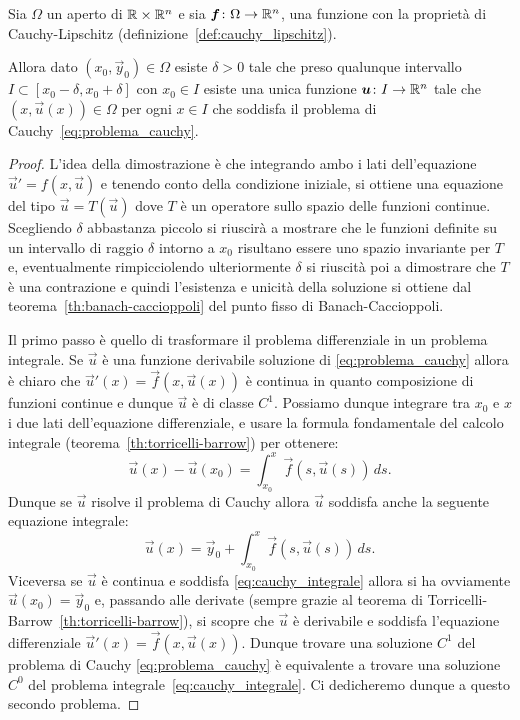 \begin{theorem}
\label{th:cauchy_lipschitz}%
%
\mymark{***}%
Sia $\Omega$ un aperto di $\mathbb R\times \mathbb R^n$ e sia $\boldsymbol f\colon \Omega \to \mathbb R^n$,
una funzione con la proprietà di Cauchy-Lipschitz
(definizione~\ref{def:cauchy_lipschitz}).

Allora dato $(x_0,\vec y_0)\in \Omega$
esiste $\delta>0$
tale che preso qualunque intervallo $I\subset [x_0-\delta,x_0+\delta]$
con $x_0\in I$
esiste una unica funzione $\boldsymbol u\colon I \to \mathbb R^n$
tale che $(x,\vec u(x))\in \Omega$ per ogni $x\in I$
che soddisfa il problema di Cauchy~\eqref{eq:problema_cauchy}.
\end{theorem}
%
%
\begin{proof}
\mymark{***}
L'idea della dimostrazione è che integrando ambo i lati dell'equazione
$\vec u' = f(x,\vec u)$ e tenendo conto della condizione iniziale, si
ottiene una equazione del tipo $\vec u = T(\vec u)$ dove $T$ è un operatore
sullo spazio delle funzioni continue.
Scegliendo $\delta$ abbastanza piccolo si riuscirà a mostrare che le funzioni
definite su un intervallo di raggio $\delta$ intorno a $x_0$ risultano
essere uno spazio invariante per $T$ e, eventualmente rimpicciolendo ulteriormente
$\delta$ si riuscità poi a dimostrare che $T$ è una contrazione e quindi
l'esistenza e unicità della soluzione si ottiene
dal teorema~\ref{th:banach-caccioppoli} del punto fisso di Banach-Caccioppoli.

Il primo passo è quello di trasformare il problema differenziale in un problema
integrale.
Se $\vec u$ è una funzione derivabile soluzione di \eqref{eq:problema_cauchy}
allora è chiaro che $\vec u'(x) = \vec f(x,\vec u(x))$ è continua in quanto
composizione di funzioni continue e dunque $\vec u$ è di classe $C^1$.
Possiamo dunque integrare tra $x_0$ e $x$ i due lati dell'equazione
differenziale, e usare la formula fondamentale del calcolo integrale
(teorema~\ref{th:torricelli-barrow})
per ottenere:
\[
  \vec u(x) - \vec u(x_0) = \int_{x_0}^x \vec f(s,\vec u(s))\, ds.
\]
Dunque se $\vec u$ risolve il problema di Cauchy allora $\vec u$ soddisfa anche
la seguente equazione integrale:
\begin{equation}\label{eq:cauchy_integrale}
  \vec u(x) = \vec y_0 + \int_{x_0}^x \vec f(s,\vec u(s))\, ds.
\end{equation}
Viceversa se $\vec u$ è continua e soddisfa \eqref{eq:cauchy_integrale}
allora si ha ovviamente
$\vec u(x_0) = \vec y_0$ e,
passando alle derivate (sempre grazie al teorema di Torricelli-Barrow~\ref{th:torricelli-barrow}),
si scopre che $\vec u$ è
derivabile e soddisfa l'equazione differenziale $\vec u'(x) = \vec f(x,\vec u(x))$.
Dunque trovare una soluzione $C^1$ del problema di Cauchy \eqref{eq:problema_cauchy}
è equivalente a trovare una soluzione $C^0$ del problema integrale~\eqref{eq:cauchy_integrale}.
Ci dedicheremo dunque a questo secondo problema.


\end{proof}
